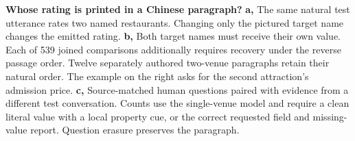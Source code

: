 \textbf{Whose rating is printed in a Chinese paragraph?}
\textbf{a,} The same natural test utterance rates two named restaurants. Changing only the pictured target name changes the emitted rating. \textbf{b,} Both target names must receive their own value. Each of 539 joined comparisons additionally requires recovery under the reverse passage order. Twelve separately authored two-venue paragraphs retain their natural order. The example on the right asks for the second attraction's admission price. \textbf{c,} Source-matched human questions paired with evidence from a different test conversation. Counts use the single-venue model and require a clean literal value with a local property cue, or the correct requested field and missing-value report. Question erasure preserves the paragraph.
